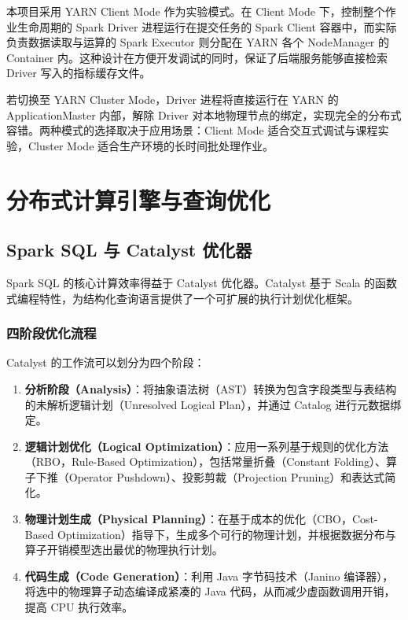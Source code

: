 本项目采用 YARN Client Mode 作为实验模式。在 Client Mode 下，控制整个作业生命周期的 Spark Driver 进程运行在提交任务的 Spark Client 容器中，而实际负责数据读取与运算的 Spark Executor 则分配在 YARN 各个 NodeManager 的 Container 内。这种设计在方便开发调试的同时，保证了后端服务能够直接检索 Driver 写入的指标缓存文件。

若切换至 YARN Cluster Mode，Driver 进程将直接运行在 YARN 的 ApplicationMaster 内部，解除 Driver 对本地物理节点的绑定，实现完全的分布式容错。两种模式的选择取决于应用场景：Client Mode 适合交互式调试与课程实验，Cluster Mode 适合生产环境的长时间批处理作业。

\section{分布式计算引擎与查询优化}

\subsection{Spark SQL 与 Catalyst 优化器}

Spark SQL 的核心计算效率得益于 Catalyst 优化器。Catalyst 基于 Scala 的函数式编程特性，为结构化查询语言提供了一个可扩展的执行计划优化框架。

\subsubsection{四阶段优化流程}

Catalyst 的工作流可以划分为四个阶段：
\begin{enumerate}
  \item \textbf{分析阶段（Analysis）}：将抽象语法树（AST）转换为包含字段类型与表结构的未解析逻辑计划（Unresolved Logical Plan），并通过 Catalog 进行元数据绑定。
  \item \textbf{逻辑计划优化（Logical Optimization）}：应用一系列基于规则的优化方法（RBO，Rule-Based Optimization），包括常量折叠（Constant Folding）、算子下推（Operator Pushdown）、投影剪裁（Projection Pruning）和表达式简化。
  \item \textbf{物理计划生成（Physical Planning）}：在基于成本的优化（CBO，Cost-Based Optimization）指导下，生成多个可行的物理计划，并根据数据分布与算子开销模型选出最优的物理执行计划。
  \item \textbf{代码生成（Code Generation）}：利用 Java 字节码技术（Janino 编译器），将选中的物理算子动态编译成紧凑的 Java 代码，从而减少虚函数调用开销，提高 CPU 执行效率。
\end{enumerate}

